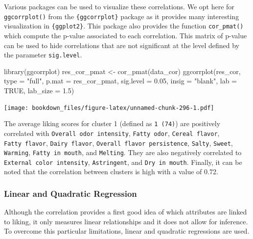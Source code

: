 \documentclass[
]{krantz}
\makeatletter
\newenvironment{Shaded}{\begin{snugshade}}{\end{snugshade}}
\newcommand{\AttributeTok}[1]{\textcolor[rgb]{0.61,0.61,0.61}{#1}}
\newcommand{\ConstantTok}[1]{\textcolor[rgb]{0,0,0}{#1}}
\newcommand{\FloatTok}[1]{\textcolor[rgb]{0.06,0.06,0.06}{#1}}
\newcommand{\FunctionTok}[1]{\textcolor[rgb]{0,0,0}{#1}}
\newcommand{\NormalTok}[1]{#1}
\newcommand{\OtherTok}[1]{\textcolor[rgb]{0.37,0.37,0.37}{#1}}
\newcommand{\StringTok}[1]{\textcolor[rgb]{0.5,0.5,0.5}{#1}}
\newenvironment{kframe}{%
\medskip{}
\setlength{\fboxsep}{.8em}
 \def\at@end@of@kframe{}%
 \ifinner\ifhmode%
  \def\at@end@of@kframe{\end{minipage}}%
  \begin{minipage}{\columnwidth}%
 \fi\fi%
 \def\FrameCommand##1{\hskip\@totalleftmargin \hskip-\fboxsep
 \colorbox{shadecolor}{##1}\hskip-\fboxsep
     \hskip-\linewidth \hskip-\@totalleftmargin \hskip\columnwidth}%
 \MakeFramed {\advance\hsize-\width
   \@totalleftmargin\z@ \linewidth\hsize
   \@setminipage}}%
 {\par\unskip\endMakeFramed%
 \at@end@of@kframe}
\renewenvironment{Shaded}{\begin{kframe}}{\end{kframe}}
\makeatother
\begin{document}
Various packages can be used to visualize these correlations. We opt here for \texttt{ggcorrplot()} from the \texttt{\{ggcorrplot\}} package as it provides many interesting visualization in \texttt{\{ggplot2\}}. This package also provides the function \texttt{cor\_pmat()} which compute the p-value associated to each correlation. This matrix of p-value can be used to hide correlations that are not significant at the level defined by the parameter \texttt{sig.level}.

\begin{Shaded}
\begin{Highlighting}[]
\FunctionTok{library}\NormalTok{(ggcorrplot)}
\NormalTok{res\_cor\_pmat }\OtherTok{\textless{}{-}} \FunctionTok{cor\_pmat}\NormalTok{(data\_cor)}
\FunctionTok{ggcorrplot}\NormalTok{(res\_cor, }\AttributeTok{type =} \StringTok{"full"}\NormalTok{, }\AttributeTok{p.mat =}\NormalTok{ res\_cor\_pmat, }
           \AttributeTok{sig.level =} \FloatTok{0.05}\NormalTok{, }\AttributeTok{insig =} \StringTok{"blank"}\NormalTok{, }
           \AttributeTok{lab =} \ConstantTok{TRUE}\NormalTok{, }\AttributeTok{lab\_size =} \FloatTok{1.5}\NormalTok{)}
\end{Highlighting}
\end{Shaded}

\texttt{[image: bookdown\_files/figure-latex/unnamed-chunk-296-1.pdf]}

The average liking scores for cluster 1 (defined as \texttt{1\ (74)}) are positively correlated with \texttt{Overall\ odor\ intensity}, \texttt{Fatty\ odor}, \texttt{Cereal\ flavor}, \texttt{Fatty\ flavor}, \texttt{Dairy\ flavor}, \texttt{Overall\ flavor\ persistence}, \texttt{Salty}, \texttt{Sweet}, \texttt{Warming}, \texttt{Fatty\ in\ mouth}, and \texttt{Melting}. They are also negatively correlated to \texttt{External\ color\ intensity}, \texttt{Astringent}, and \texttt{Dry\ in\ mouth}.
Finally, it can be noted that the correlation between clusters is high with a value of 0.72.

\hypertarget{linear-and-quadratic-regression}{%
\subsubsection{Linear and Quadratic Regression}\label{linear-and-quadratic-regression}}

Although the correlation provides a first good idea of which attributes are linked to liking, it only measures linear relationships and it does not allow for inference. To overcome this particular limitations, linear and quadratic regressions are used.
\end{document}

